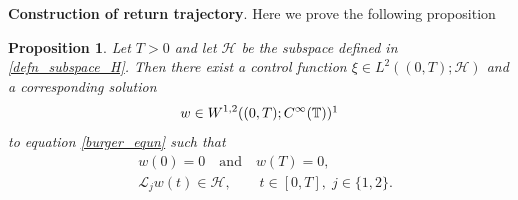 \documentclass[10pt, reqno]{amsart}
\newtheorem{proposition}{Proposition} [section]
\numberwithin{equation}{section}
\begin{document}
\textbf{Construction of return trajectory}. Here we prove the following proposition
\begin{proposition}
	Let $T>0$ and let $\mathcal{H}$ be the subspace defined in \eqref{defn_subspace_H}. Then there exist a control function $\xi \in L^2((0,T);\mathcal{H})$ and a corresponding solution 
	\[
	w \in W^{1,2}((0,T);C^{\infty}(\mathbb{T}))\footnotemark
	\]
	to equation \eqref{burger_equn} such that
	\begin{align}
		& w(0)=0 \quad \text{and} \quad w(T)=0, \label{w_zero_both_end}\\
		& \mathcal{L}_j w(t) \in \mathcal{H}, \qquad t\in[0,T], \; j\in\{1,2\}. \label{L_j_w_in_H}
	\end{align}
\end{proposition}
\end{document}
